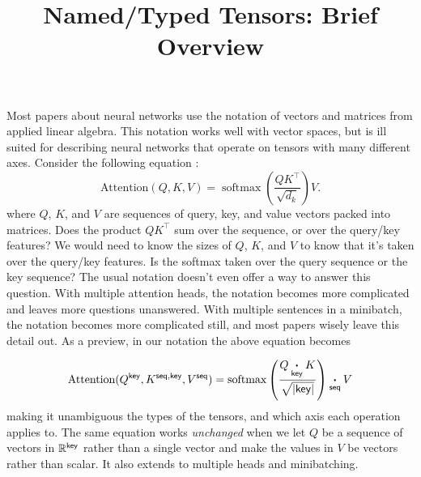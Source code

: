 \documentclass{article}
\title{Named/Typed Tensors: Brief Overview}
\DeclareMathOperator*{\softmax}{softmax}
\begin{document}
\maketitle 
Most papers about neural networks use the notation of vectors and matrices from applied linear algebra.  This notation works well with vector spaces, but is ill suited for describing neural networks that operate on tensors with many different axes. Consider the following equation \citep{vaswani+:2017}:
\begin{equation}
  \text{Attention}(Q, K, V) = \softmax \left( \frac{QK^\top}{\sqrt{d_k}} \right) V. 
  \label{eq:attention-naive}
\end{equation} 
where $Q$, $K$, and $V$ are sequences of query, key, and value vectors packed into matrices. Does the product $QK^\top$ sum over the sequence, or over the query/key features? We would need to know the sizes of $Q$, $K$, and $V$ to know that it's taken over the query/key features. Is the softmax taken over the query sequence or the key sequence? The usual notation doesn't even offer a way to answer this question. With multiple attention heads, the notation becomes more complicated and leaves more questions unanswered. With multiple sentences in a minibatch, the notation becomes more complicated still, and most papers wisely leave this detail out.
As a preview, in our notation the above equation becomes

\begin{equation}
  \text{Attention}(Q^{\mathsf{key}},K^{\mathsf{seq},\mathsf{key}},V^{\mathsf{seq}}) = \mathop{\text{softmax}}\limits_{\mathsf{}} \left( \frac{Q \mathbin{\mathop{\boldsymbol\cdot}\limits_{\mathsf{key}}} K}{\sqrt{|\mathsf{key}|}} \right) \mathbin{\mathop{\boldsymbol\cdot}\limits_{\mathsf{seq}}} V  
\label{eq:attention-new}
\end{equation}
making it unambiguous the types of the tensors, and which axis each operation applies to. The same equation works \emph{unchanged} when we let $Q$ be a sequence of vectors in $\mathbb{R}^{\mathsf{key}}$ rather than a single vector and make the values in $V$ be vectors rather than scalar. It also extends to multiple heads and minibatching. 
\end{document}
